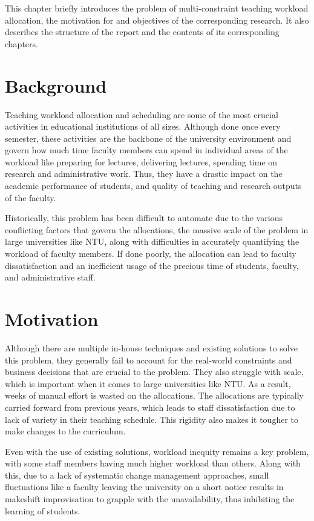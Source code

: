 
This chapter briefly introduces the problem of multi-constraint teaching workload allocation, the motivation for and objectives of the corresponding research. It also describes the structure of the report and the contents of its corresponding chapters.

\section{Background}

Teaching workload allocation and scheduling are some of the most crucial activities in educational institutions of all sizes. Although done once every semester, these activities are the backbone of the university environment and govern how much time faculty members can spend in individual areas of the workload like preparing for lectures, delivering lectures, spending time on research and administrative work. Thus, they have a drastic impact on the academic performance of students, and quality of teaching and research outputs of the faculty.

Historically, this problem has been difficult to automate due to the various conflicting factors that govern the allocations, the massive scale of the problem in large universities like NTU, along with difficulties in accurately quantifying the workload of faculty members. If done poorly, the allocation can lead to faculty dissatisfaction and an inefficient usage of the precious time of students, faculty, and administrative staff.

\section{Motivation}

Although there are multiple in-house techniques and existing solutions to solve this problem, they generally fail to account for the real-world constraints and business decisions that are crucial to the problem. They also struggle with scale, which is important when it comes to large universities like NTU. As a result, weeks of manual effort is wasted on the allocations. The allocations are typically carried forward from previous years, which leads to staff dissatisfaction due to lack of variety in their teaching schedule. This rigidity also makes it tougher to make changes to the curriculum.

Even with the use of existing solutions, workload inequity remains a key problem, with some staff members having much higher workload than others. Along with this, due to a lack of systematic change management approaches, small fluctuations like a faculty leaving the university on a short notice results in makeshift improvisation to grapple with the unavailability, thus inhibiting the learning of students.


